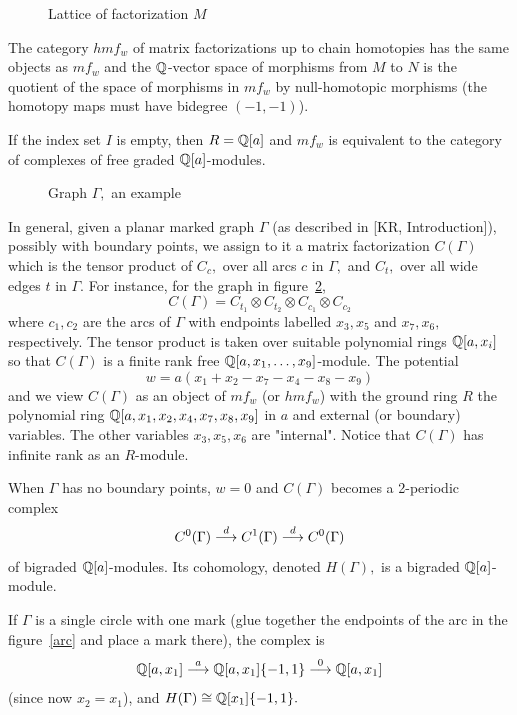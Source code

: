 \documentclass[12pt]{article}
\begin{document}
\begin{figure}  \caption{Lattice of factorization $M$} \label{lattice}
\end{figure} 

The category $hmf_w$ of matrix factorizations up to chain homotopies has 
the same objects as $mf_w$ and the $\mathbb Q$-vector space of morphisms from 
$M$ to $N$ is the quotient of the space of morphisms in $mf_w$ by null-homotopic 
morphisms (the homotopy maps must have bidegree $(-1,-1)$). 

If the index set $I$ is empty, then $R=\mathbb Q[a]$ and $mf_w$ is equivalent to 
the category of complexes of free graded $\mathbb Q[a]$-modules. 

\begin{figure}  
\caption{Graph $\Gamma,$ an example}\label{diagbound} \end{figure}

In general, given a planar marked graph $\Gamma$ (as described in [KR, Introduction]), 
possibly with boundary points, we assign to it a  matrix factorization $C(\Gamma)$ which 
is the tensor product of $C_c,$ over all arcs $c$ in $\Gamma,$ and $C_t,$ over all 
wide edges $t$ in $\Gamma.$ For instance, for the graph in 
figure~\ref{diagbound}, 
$$C(\Gamma) = C_{t_1} \otimes C_{t_2} \otimes C_{c_1} \otimes C_{c_2}$$ 
where $c_1,c_2$ are the arcs of $\Gamma$ with endpoints labelled 
$x_3,x_5$ and 
$x_7,x_6,$ respectively. The tensor product is taken over suitable polynomial 
rings $\mathbb Q[a,x_i]$ so that $C(\Gamma)$ is a finite rank free 
$\mathbb Q[a,x_1, \dots, x_9]$-module. The potential 
$$w=a(x_1 + x_2 - x_7 - x_4 - x_8 -x_9)$$ 
and we view $C(\Gamma)$ as an object of $mf_w$ (or $hmf_w$) with the 
ground ring $R$ 
 the polynomial ring $\mathbb Q[a,x_1,x_2,x_4,x_7,x_8,x_9]$ in $a$ and 
external (or boundary) variables. The other variables 
$x_3,x_5,x_6$ are "internal". Notice that $C(\Gamma)$ has 
infinite rank as an $R$-module.  

When $\Gamma$ has no boundary points, $w=0$ and $C(\Gamma)$ becomes 
a 2-periodic complex 
 $$ C^0(\Gamma) \stackrel{d}{\longrightarrow} C^1(\Gamma) \stackrel{d}{\longrightarrow} C^0(\Gamma)$$ 
of bigraded $\mathbb Q[a]$-modules. Its cohomology, denoted $H(\Gamma),$ is a 
bigraded $\mathbb Q[a]$-module.  

If $\Gamma$ is a single circle with one mark (glue together 
the endpoints of the arc in the figure~\ref{arc} and place a mark there), the complex 
is 
$$ \mathbb Q[a, x_1] \stackrel{a}{\longrightarrow}\mathbb Q[a,x_1]\{-1,1\} \stackrel{0}{\longrightarrow} \mathbb Q[a,x_1] $$ 
(since now $x_2=x_1$), and  $H(\Gamma)\cong \mathbb Q[x_1]\{-1,1\}.$ 
\end{document}

